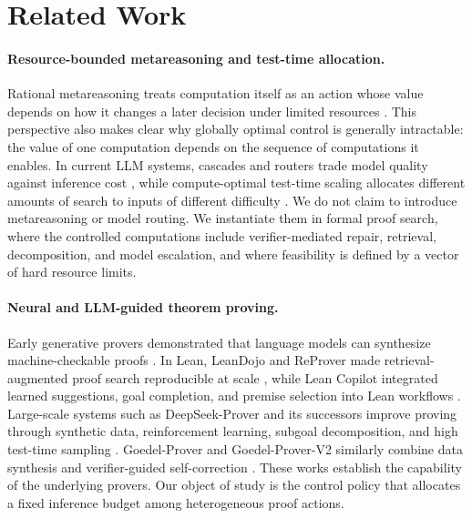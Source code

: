 \section{Related Work}

\paragraph{Resource-bounded metareasoning and test-time allocation.}
Rational metareasoning treats computation itself as an action whose value
depends on how it changes a later decision under limited resources
\cite{horvitz1987resource,russell1991metareasoning,hay2012selecting}.
This perspective also makes clear why globally optimal control is generally
intractable: the value of one computation depends on the sequence of
computations it enables. In current LLM systems, cascades and routers trade
model quality against inference cost \cite{chen2023frugalgpt,ong2024routellm},
while compute-optimal test-time scaling allocates different amounts of search
to inputs of different difficulty \cite{snell2025scaling}. We do not claim to
introduce metareasoning or model routing. We instantiate them in formal proof
search, where the controlled computations include verifier-mediated repair,
retrieval, decomposition, and model escalation, and where feasibility is
defined by a vector of hard resource limits.

\paragraph{Neural and LLM-guided theorem proving.}
Early generative provers demonstrated that language models can synthesize
machine-checkable proofs \cite{polu2020gptf}. In Lean, LeanDojo and ReProver
made retrieval-augmented proof search reproducible at scale
\cite{yang2023leandojo}, while Lean Copilot integrated learned suggestions,
goal completion, and premise selection into Lean workflows
\cite{song2024leancopilot}. Large-scale systems such as DeepSeek-Prover and its
successors improve proving through synthetic data, reinforcement learning,
subgoal decomposition, and high test-time sampling
\cite{xin2024deepseekprover,ren2025deepseekprov_v2}. Goedel-Prover and
Goedel-Prover-V2 similarly combine data synthesis and verifier-guided
self-correction \cite{lin2025goedel,lin2025goedelv2}. These works establish the
capability of the underlying provers. Our object of study is the control policy
that allocates a fixed inference budget among heterogeneous proof actions.

